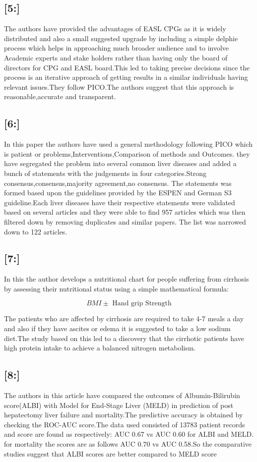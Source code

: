 \documentclass{article}
\begin{document}
\begin{multicols}{2}
\subsection{[5:]}
The authors have provided the advantages of EASL CPGs as it is widely distributed and also a small suggested upgrade by including a simple delphie process which helps in approaching much broader audience and to involve Academic experts and stake holders rather than having only the board of directors for CPG and EASL board.This led to taking precise decisions since the process is an iterative approach of getting results in a similar individuals having relevant issues.They follow PICO.The authors suggest that this approach is reasonable,accurate and transparent.
\subsection{[6:]}
In this paper the authors have used a general methodology following PICO which is patient or problems,Interventions,Comparison of methods and Outcomes. they have segregated the problem into several common liver diseases and added a bunch of statements with the judgements in four categories.Strong consensus,consensus,majority agreement,no consensus. The statements was formed based upon the guidelines provided by the ESPEN and German S3 guideline.Each liver diseases have their respective statements were validated based on several articles and they were able to find 957 articles which was then filtered down by removing duplicates and similar papers. The list was narrowed down to 122 articles.
\subsection{[7:]}
In this the author develops a nutritional chart for people suffering from cirrhosis by assessing their nutritional status using a simple mathematical formula:

\[BMI \pm \text{ Hand grip Strength}\]

The patients who are affected by cirrhosis are required to take 4-7 meals a day and also if they have ascites or edema it is suggested to take a low sodium diet.The study based on this led to a discovery that the cirrhotic patients have high protein intake to achieve a balanced nitrogen metabolism.
\subsection{[8:]}
The authors in this article have compared the outcomes of Albumin-Bilirubin score(ALBI) with Model for End-Stage Liver (MELD) in prediction of post hepatectomy liver failure and mortality.The predictive accuracy is obtained by checking the ROC-AUC score.The data used consisted of 13783 patient records and score are found as respectively: AUC 0.67 vs AUC 0.60 for ALBI and MELD. for mortality the scores are as follows AUC 0.70 vs AUC 0.58.So the comparative studies suggest that ALBI scores are better compared to MELD score

\end{multicols}
\end{document}
